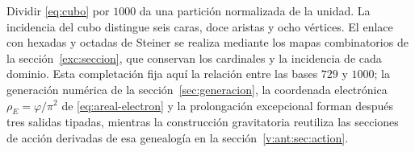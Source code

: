 Dividir \eqref{eq:cubo} por \(1000\) da una partición normalizada de la unidad. La incidencia del cubo distingue seis caras, doce aristas y ocho vértices. El enlace con hexadas y octadas de Steiner se realiza mediante los mapas combinatorios de la sección~\ref{exc:seccion}, que conservan los cardinales y la incidencia de cada dominio. Esta completación fija aquí la relación entre las bases \(729\) y \(1000\); la generación numérica de la sección~\ref{sec:generacion}, la coordenada electrónica \(\rho_E=\varphi/\pi^2\) de \eqref{eq:areal-electron} y la prolongación excepcional forman después tres salidas tipadas, mientras la construcción gravitatoria reutiliza las secciones de acción derivadas de esa genealogía en la sección~\ref{v:ant:sec:action}.






